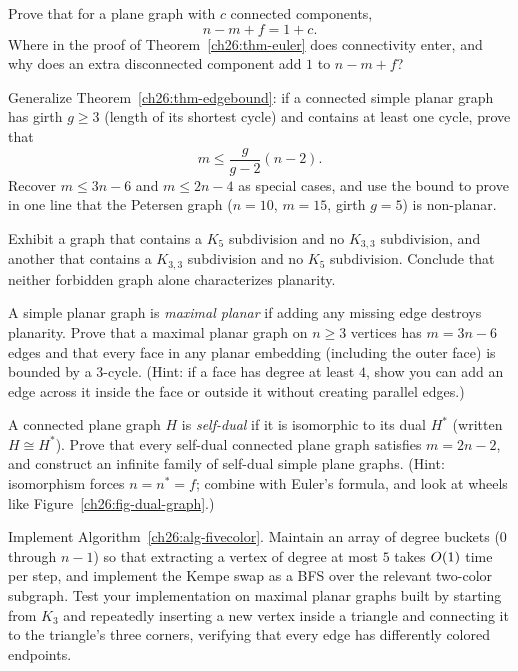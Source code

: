 \begin{exercise}
Prove that for a plane graph with $c$ connected components,
\[
  n - m + f = 1 + c.
\]
Where in the proof of Theorem~\ref{ch26:thm-euler} does connectivity enter, and why does an
extra disconnected component add $1$ to $n - m + f$?
\end{exercise}

\begin{exercise}
Generalize Theorem~\ref{ch26:thm-edgebound}: if a connected simple planar graph has girth
$g \ge 3$ (length of its shortest cycle) and contains at least one cycle, prove that
\[
  m \le \frac{g}{g-2}(n-2).
\]
Recover $m \le 3n-6$ and $m \le 2n-4$ as special cases, and use the bound to prove in one
line that the Petersen graph ($n=10$, $m=15$, girth $g=5$) is non-planar.
\end{exercise}

\begin{exercise}
Exhibit a graph that contains a $K_5$ subdivision and no $K_{3,3}$ subdivision, and another
that contains a $K_{3,3}$ subdivision and no $K_5$ subdivision. Conclude that neither
forbidden graph alone characterizes planarity.
\end{exercise}

\begin{exercise}[Maximal planar = triangulation]
A simple planar graph is \emph{maximal planar} if adding any missing edge destroys
planarity. Prove that a maximal planar graph on $n\ge 3$ vertices has $m = 3n-6$ edges and
that every face in any planar embedding (including the outer face) is bounded by a
$3$-cycle. (Hint: if a face has degree at least $4$, show you can add an edge across it
inside the face or outside it without creating parallel edges.)
\end{exercise}

\begin{exercise}
A connected plane graph $H$ is \emph{self-dual} if it is isomorphic to its dual $H^\ast$
(written $H \cong H^\ast$). Prove that every self-dual connected plane graph satisfies
$m = 2n - 2$, and construct an infinite family of self-dual simple plane graphs. (Hint:
isomorphism forces $n = n^\ast = f$; combine with Euler's formula, and look at wheels like
Figure~\ref{ch26:fig-dual-graph}.)
\end{exercise}

\begin{exercise}
Implement Algorithm~\ref{ch26:alg-fivecolor}. Maintain an array of degree buckets ($0$
through $n-1$) so that extracting a vertex of degree at most $5$ takes $O(1)$ time per
step, and implement the Kempe swap as a BFS over the relevant two-color subgraph. Test your
implementation on maximal planar graphs built by starting from $K_3$ and repeatedly
inserting a new vertex inside a triangle and connecting it to the triangle's three corners,
verifying that every edge has differently colored endpoints.
\end{exercise}

